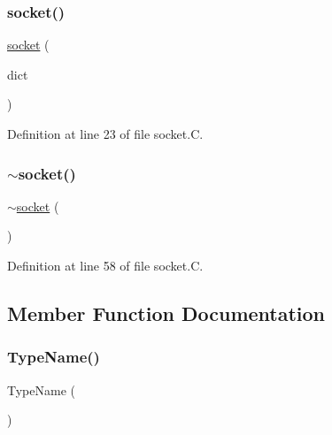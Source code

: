 \subsubsection{\texorpdfstring{socket()}{socket()}}
{\footnotesize\ttfamily \hyperlink{classFoam_1_1socket}{socket} (\begin{DoxyParamCaption}\item[{const dictionary \&}]{dict }\end{DoxyParamCaption})}



Definition at line 23 of file socket.\+C.

\mbox{\label{classFoam_1_1socket_a3cb65ce2c1bff89efe4e755d3587848e}} 
\subsubsection{\texorpdfstring{$\sim$socket()}{~socket()}}
{\footnotesize\ttfamily $\sim$\hyperlink{classFoam_1_1socket}{socket} (\begin{DoxyParamCaption}{ }\end{DoxyParamCaption})\hspace{0.3cm}{\ttfamily [virtual]}}



Definition at line 58 of file socket.\+C.



\subsection{Member Function Documentation}
\mbox{\label{classFoam_1_1socket_a6a8cf74836209cfff437109ceeffd442}} 
\subsubsection{\texorpdfstring{Type\+Name()}{TypeName()}}
{\footnotesize\ttfamily Type\+Name (\begin{DoxyParamCaption}\item[{\char`\"{}socket\char`\"{}}]{ }\end{DoxyParamCaption})}

\mbox{\label{classFoam_1_1socket_aaef38f7ec08b1ae0135900e9ae1fb1f8}} 
